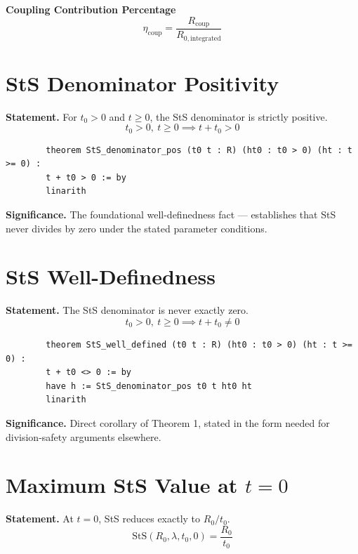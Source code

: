 \documentclass[11pt,a4paper]{article}
\begin{document}
	\textbf{Coupling Contribution Percentage}
	\begin{equation}
		\eta_{\text{coup}} = \frac{R_{\text{coup}}}{R_{0,\text{integrated}}}
	\end{equation}
	
	\newpage
	
	\section{StS Denominator Positivity}
	
	\textbf{Statement.} For $t_0 > 0$ and $t \geq 0$, the StS denominator is strictly positive.
	\begin{equation}
		t_0 > 0,\ t \geq 0 \implies t + t_0 > 0
	\end{equation}
	
	\begin{lstlisting}
		theorem StS_denominator_pos (t0 t : R) (ht0 : t0 > 0) (ht : t >= 0) :
		t + t0 > 0 := by
		linarith
	\end{lstlisting}
	
	\noindent\textbf{Significance.} The foundational well-definedness fact --- establishes that StS never divides by zero under the stated parameter conditions.
	
	\section{StS Well-Definedness}
	
	\textbf{Statement.} The StS denominator is never exactly zero.
	\begin{equation}
		t_0 > 0,\ t \geq 0 \implies t + t_0 \neq 0
	\end{equation}
	
	\begin{lstlisting}
		theorem StS_well_defined (t0 t : R) (ht0 : t0 > 0) (ht : t >= 0) :
		t + t0 <> 0 := by
		have h := StS_denominator_pos t0 t ht0 ht
		linarith
	\end{lstlisting}
	
	\noindent\textbf{Significance.} Direct corollary of Theorem 1, stated in the form needed for division-safety arguments elsewhere.
	
	\section{Maximum StS Value at $t = 0$}
	
	\textbf{Statement.} At $t=0$, StS reduces exactly to $R_0/t_0$.
	\begin{equation}
		\text{StS}(R_0, \lambda, t_0, 0) = \frac{R_0}{t_0}
	\end{equation}
	
\end{document}
